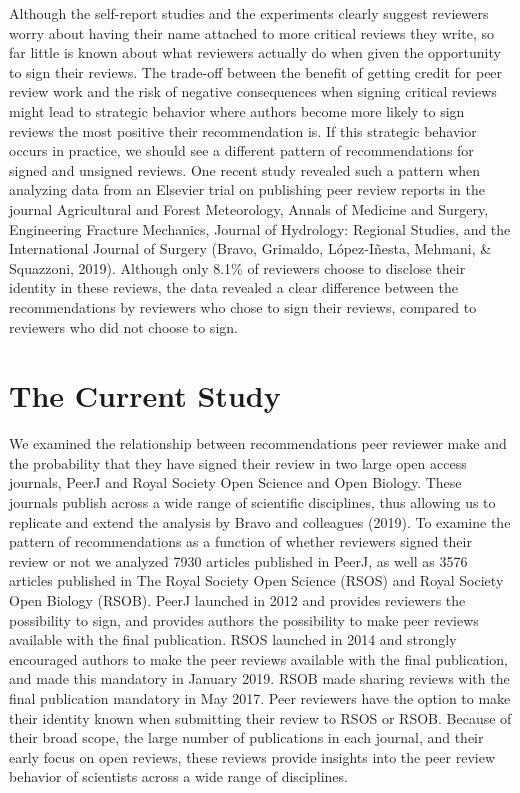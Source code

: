 \documentclass[,jou, a4paper,floatsintext]{apa6}
\begin{document}
Although the self-report studies and the experiments clearly suggest reviewers worry about having their name attached to more critical reviews they write, so far little is known about what reviewers actually do when given the opportunity to sign their reviews. The trade-off between the benefit of getting credit for peer review work and the risk of negative consequences when signing critical reviews might lead to strategic behavior where authors become more likely to sign reviews the most positive their recommendation is. If this strategic behavior occurs in practice, we should see a different pattern of recommendations for signed and unsigned reviews. One recent study revealed such a pattern when analyzing data from an Elsevier trial on publishing peer review reports in the journal Agricultural and Forest Meteorology, Annals of Medicine and Surgery, Engineering Fracture Mechanics, Journal of Hydrology: Regional Studies, and the International Journal of Surgery (Bravo, Grimaldo, López-Iñesta, Mehmani, \& Squazzoni, 2019). Although only 8.1\% of reviewers choose to disclose their identity in these reviews, the data revealed a clear difference between the recommendations by reviewers who chose to sign their reviews, compared to reviewers who did not choose to sign.

\hypertarget{the-current-study}{%
\section{The Current Study}\label{the-current-study}}

We examined the relationship between recommendations peer reviewer make and the probability that they have signed their review in two large open access journals, PeerJ and Royal Society Open Science and Open Biology. These journals publish across a wide range of scientific disciplines, thus allowing us to replicate and extend the analysis by Bravo and colleagues (2019). To examine the pattern of recommendations as a function of whether reviewers signed their review or not we analyzed 7930 articles published in PeerJ, as well as 3576 articles published in The Royal Society Open Science (RSOS) and Royal Society Open Biology (RSOB). PeerJ launched in 2012 and provides reviewers the possibility to sign, and provides authors the possibility to make peer reviews available with the final publication. RSOS launched in 2014 and strongly encouraged authors to make the peer reviews available with the final publication, and made this mandatory in January 2019. RSOB made sharing reviews with the final publication mandatory in May 2017. Peer reviewers have the option to make their identity known when submitting their review to RSOS or RSOB. Because of their broad scope, the large number of publications in each journal, and their early focus on open reviews, these reviews provide insights into the peer review behavior of scientists across a wide range of disciplines.
\end{document}
